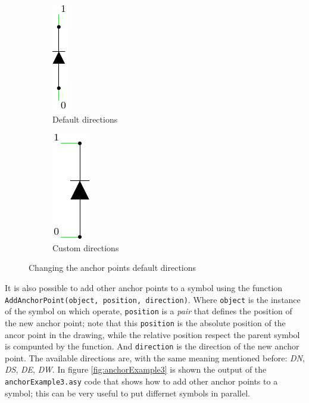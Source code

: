 \documentclass[a4paper,12pt]{report}
\begin{document}
\begin{figure}
  \centering
  \begin{subfigure}{.4\textwidth}
    \centering
    \includegraphics[width=0.1\linewidth]{anchorExample1.pdf}
    \caption{Default directions}
    \label{subFig:anchorExampleDefault}
  \end{subfigure}\hfill
  \begin{subfigure}{.4\textwidth}
    \centering
    \includegraphics[width=0.2\linewidth]{anchorExample2.pdf}
    \caption{Custom directions}
    \label{subFig:anchorExampleCustom}
  \end{subfigure}\hfill
  \caption{Changing the anchor points default directions}
  \label{fig:anchorPointExample}
\end{figure}

It is also possible to add other anchor points to a symbol using the function \texttt{AddAnchorPoint(object, position, direction)}. Where \texttt{object} is the instance of the symbol on which operate, \texttt{position} is a \emph{pair} that defines the position of the new anchor point; note that this \texttt{position} is the absolute position of the ancor point in the drawing, while the relative position respect the parent symbol is compunted by the function. And \texttt{direction} is the direction of the new anchor point. The available directions are, with the same meaning mentioned before: \emph{DN}, \emph{DS}, \emph{DE}, \emph{DW}. In figure \ref{fig:anchorExample3} is shown the output of the \texttt{anchorExample3.asy} code that shows how to add other anchor points to a symbol; this can be very useful to put differnet symbols in parallel.
\end{document}
